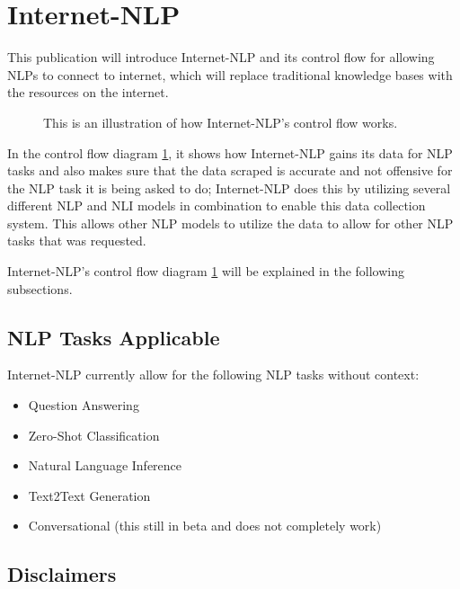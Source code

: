 \section{Internet-NLP}

This publication will introduce Internet-NLP and its control flow for allowing NLPs to connect to internet, which will replace traditional knowledge bases with the resources on the internet.

\begin{figure}
    \begin{center}
        
        \caption{This is an illustration of how Internet-NLP's control flow works.}
        \label{fig:ControlFlow}
    \end{center}
\end{figure}

In the control flow diagram \ref{fig:ControlFlow}, it shows how Internet-NLP gains its data for NLP tasks and also makes sure that the data scraped is accurate and not offensive for the NLP task it is being asked to do; Internet-NLP does this by utilizing several different NLP and NLI models in combination to enable this data collection system. This allows other NLP models to utilize the data to allow for other NLP tasks that was requested.

Internet-NLP's control flow diagram \ref{fig:ControlFlow} will be explained in the following subsections.

\subsection{NLP Tasks Applicable}

Internet-NLP currently allow for the following NLP tasks without context:

\begin{itemize}[leftmargin=1em]
    \item Question Answering
    \item Zero-Shot Classification
    \item Natural Language Inference
    \item Text2Text Generation
    \item Conversational (this still in beta and does not completely work)
\end{itemize}

\subsection{Disclaimers}

